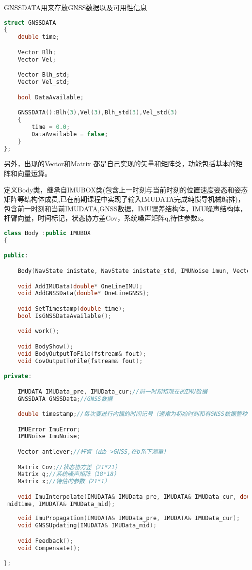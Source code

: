 \documentclass[codepkg=listings,theme=fancy]{course-report}
\begin{document}
GNSSDATA用来存放GNSS数据以及可用性信息
\begin{lstlisting}[language=C++,emph={Matrix,ANGLE,Vector,IMUError,IMUDATA,IMUNoise,*,,,&,GNSSDATA,IMUBOX},emphstyle=\color{cyan}]
struct GNSSDATA
{
	double time;

	Vector Blh;
	Vector Vel;

	Vector Blh_std;
	Vector Vel_std;

	bool DataAvailable;

	GNSSDATA():Blh(3),Vel(3),Blh_std(3),Vel_std(3)
	{
		time = 0.0;
		DataAvailable = false;
	}
};
\end{lstlisting}

另外，出现的Vector和Matrix 都是自己实现的矢量和矩阵类，功能包括基本的矩阵和向量运算。

定义Body类，继承自IMUBOX类(包含上一时刻与当前时刻的位置速度姿态和姿态矩阵等结构体成员,已在前期课程中实现了输入IMUDATA完成纯惯导机械编排)，包含前一时刻和当前IMUDATA,GNSS数据，IMU误差结构体，IMU噪声结构体，杆臂向量，时间标记，状态协方差Cov，系统噪声矩阵q,待估参数x。
\begin{lstlisting}[language=C++,emph={Matrix,ANGLE,Vector,IMUError,IMUDATA,IMUNoise,*,,,&,GNSSDATA,IMUBOX},emphstyle=\color{cyan}]
class Body :public IMUBOX
{

public:

	Body(NavState inistate, NavState inistate_std, IMUNoise imun, Vector lb);

	void AddIMUData(double* OneLineIMU);
	void AddGNSSData(double* OneLineGNSS);

	void SetTimestamp(double time);
	bool IsGNSSDataAvailable();

	void work();

	void BodyShow();
	void BodyOutputToFile(fstream& fout);
	void CovOutputToFile(fstream& fout);

private:

	IMUDATA IMUData_pre, IMUData_cur;//前一时刻和现在的IMU数据
	GNSSDATA GNSSData;//GNSS数据

	double timestamp;//每次要进行内插的时间记号（通常为初始时刻和有GNSS数据整秒）

	IMUError ImuError;
	IMUNoise ImuNoise;

	Vector antlever;//杆臂（由b->GNSS,在b系下测量）

	Matrix Cov;//状态协方差（21*21）
	Matrix q;//系统噪声矩阵（18*18）
	Matrix x;//待估的参数（21*1）

	void ImuInterpolate(IMUDATA& IMUData_pre, IMUDATA& IMUData_cur, double
 midtime, IMUDATA& IMUData_mid);
	
	void ImuPropagation(IMUDATA& IMUData_pre, IMUDATA& IMUData_cur);
	void GNSSUpdating(IMUDATA& IMUData_mid);

	void Feedback();
	void Compensate();

};
\end{lstlisting}
\end{document}
